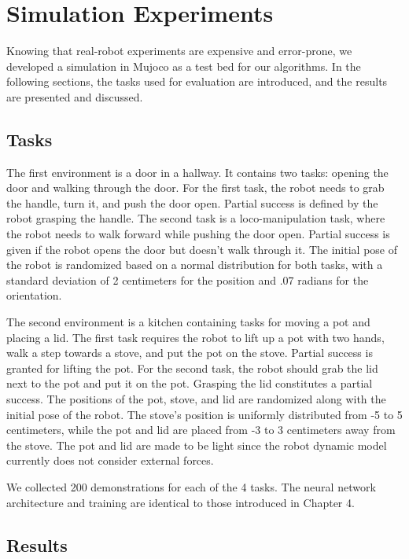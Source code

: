 \chapter{Simulation Experiments}

Knowing that real-robot experiments are expensive and error-prone, we developed a simulation in Mujoco as a test bed for our algorithms. In the following sections, the tasks used for evaluation are introduced, and the results are presented and discussed. 

\section{Tasks}

The first environment is a door in a hallway. It contains two tasks: opening the door and walking through the door. For the first task, the robot needs to grab the handle, turn it, and push the door open. Partial success is defined by the robot grasping the handle. The second task is a loco-manipulation task, where the robot needs to walk forward while pushing the door open. Partial success is given if the robot opens the door but doesn't walk through it. The initial pose of the robot is randomized based on a normal distribution for both tasks, with a standard deviation of 2 centimeters for the position and .07 radians for the orientation. 

The second environment is a kitchen containing tasks for moving a pot and placing a lid. The first task requires the robot to lift up a pot with two hands, walk a step towards a stove, and put the pot on the stove. Partial success is granted for lifting the pot. For the second task, the robot should grab the lid next to the pot and put it on the pot. Grasping the lid constitutes a partial success. The positions of the pot, stove, and lid are randomized along with the initial pose of the robot. The stove's position is uniformly distributed from -5 to 5 centimeters, while the pot and lid are placed from -3 to 3 centimeters away from the stove. The pot and lid are made to be light since the robot dynamic model currently does not consider external forces. 

We collected 200 demonstrations for each of the 4 tasks. The neural network architecture and training are identical to those introduced in Chapter 4. 

\section{Results}

